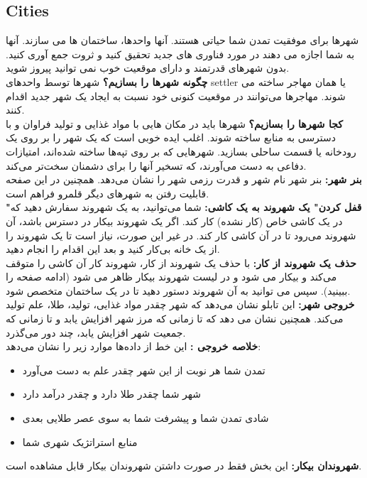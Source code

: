 \documentclass[]{article}
\begin{document}
\subsection*{{\titr Cities}}
شهرها برای موفقیت تمدن شما حیاتی هستند. آنها واحدها، ساختمان ها می سازند. آنها به شما اجازه می دهند در مورد فناوری های جدید تحقیق کنید و ثروت جمع آوری کنید. بدون شهرهای قدرتمند و دارای موقعیت خوب نمی توانید پیروز شوید.
\\\noindent \textbf{چگونه شهر‌ها را بسازیم؟}
شهرها توسط واحدهای settler یا همان مهاجر ساخته می شوند. مهاجرها می‌توانند در موقعیت کنونی خود نسبت به ایجاد یک شهر جدید اقدام کنند.
\\\noindent \textbf{کجا شهرها را بسازیم؟}
شهرها باید در مکان هایی با مواد غذایی و تولید فراوان و با دسترسی به منابع ساخته شوند. اغلب ایده خوبی است که یک شهر را بر روی یک رودخانه یا قسمت ساحلی بسازید. شهرهایی که بر روی تپه‌ها ساخته شده‌اند، امتیازات دفاعی به دست می‌آورند، که تسخیر آنها را برای دشمنان سخت‌تر می‌کند.
\\\noindent \textbf{بنر شهر:}
بنر شهر نام شهر و قدرت رزمی شهر را نشان می‌دهد. همچنین در این صفحه قابلیت رفتن به شهرهای دیگر قلمرو فراهم است.
\\\noindent \textbf{"قفل کردن" یک شهروند به یک کاشی:}
شما می‌توانید، به یک شهروند سفارش دهید که در یک کاشی خاص (کار نشده) کار کند. اگر یک شهروند بیکار در دسترس باشد، آن شهروند می‌رود تا در آن کاشی کار کند. در غیر این صورت، نیاز است تا یک شهروند را از یک خانه بی‌کار کنید و بعد این اقدام را انجام دهید.
\\\noindent \textbf{حذف یک شهروند از کار:}
با حذف یک شهروند از کار، شهروند کار آن کاشی را متوقف می‌کند و بیکار می شود و در لیست شهروند بیکار ظاهر می شود (ادامه صفحه را ببینید). سپس می توانید به آن شهروند دستور دهید تا در یک ساختمان متخصص شود.
\\\noindent \textbf{خروجی شهر:}
این تابلو نشان می‌دهد که شهر چقدر مواد غذایی، تولید، طلا، علم تولید می‌کند. همچنین نشان می دهد که تا زمانی که مرز شهر افزایش یابد و تا زمانی که جمعیت شهر افزایش یابد، چند دور می‌گذرد.
\\\noindent \textbf{خلاصه خروجی :}
این خط از داده‌ها موارد زیر را نشان می‌دهد:
\begin{itemize}
	\item تمدن شما هر نوبت از این شهر چقدر علم به دست می‌آورد
	\item شهر شما چقدر طلا دارد و چقدر درآمد دارد
	\item شادی تمدن شما و پیشرفت شما به سوی عصر طلایی بعدی
	\item منابع استراتژیک شهری شما
\end{itemize}
\noindent \textbf{شهروندان بیکار:} این بخش فقط در صورت داشتن شهروندان بیکار قابل مشاهده است.
\end{document}
